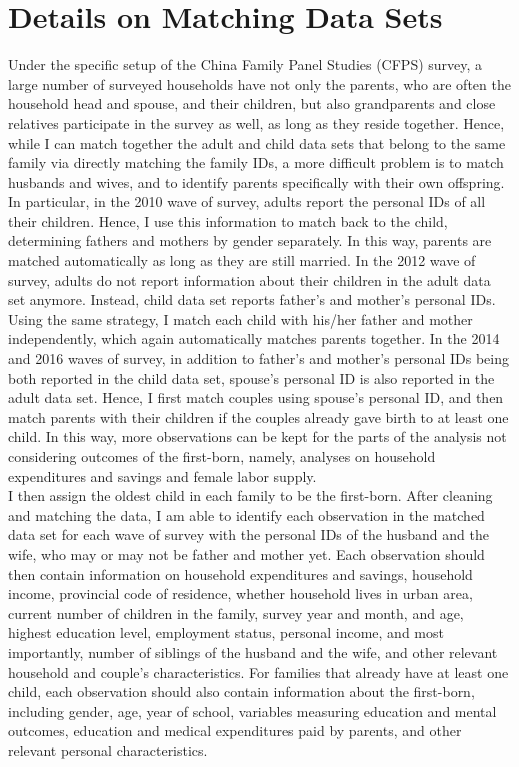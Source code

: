 \documentclass[12pt]{extarticle}
\begin{document}
\clearpage

\section{Details on Matching Data Sets} \label{matching}
\indent Under the specific setup of the China Family Panel Studies (CFPS) survey, a large number of surveyed households have not only the parents, who are often the household head and spouse, and their children, but also grandparents and close relatives participate in the survey as well, as long as they reside together. Hence, while I can match together the adult and child data sets that belong to the same family via directly matching the family IDs, a more difficult problem is to match husbands and wives, and to identify parents specifically with their own offspring. \\
\indent In particular, in the 2010 wave of survey, adults report the personal IDs of all their children. Hence, I use this information to match back to the child, determining fathers and mothers by gender separately. In this way, parents are matched automatically as long as they are still married. In the 2012 wave of survey, adults do not report information about their children in the adult data set anymore. Instead, child data set reports father's and mother's personal IDs. Using the same strategy, I match each child with his/her father and mother independently, which again automatically matches parents together. In the 2014 and 2016 waves of survey, in addition to father's and mother's personal IDs being both reported in the child data set, spouse's personal ID is also reported in the adult data set. Hence, I first match couples using spouse's personal ID, and then match parents with their children if the couples already gave birth to at least one child. In this way, more observations can be kept for the parts of the analysis not considering outcomes of the first-born, namely, analyses on household expenditures and savings and female labor supply. \\
\indent I then assign the oldest child in each family to be the first-born. After cleaning and matching the data, I am able to identify each observation in the matched data set for each wave of survey with the personal IDs of the husband and the wife, who may or may not be father and mother yet. Each observation should then contain information on household expenditures and savings, household income, provincial code of residence, whether household lives in urban area, current number of children in the family, survey year and month, and age, highest education level, employment status, personal income, and most importantly, number of siblings of the husband and the wife, and other relevant household and couple's characteristics. For families that already have at least one child, each observation should also contain information about the first-born, including gender, age, year of school, variables measuring education and mental outcomes, education and medical expenditures paid by parents, and other relevant personal characteristics.
\end{document}
